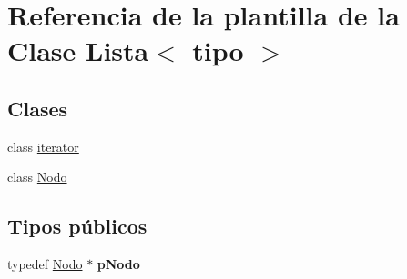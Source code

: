 \hypertarget{classLista}{}\section{Referencia de la plantilla de la Clase Lista$<$ tipo $>$}
\label{classLista}
\subsection*{Clases}
\begin{DoxyCompactItemize}
\item 
class \hyperlink{classLista_1_1iterator}{iterator}
\item 
class \hyperlink{classLista_1_1Nodo}{Nodo}
\end{DoxyCompactItemize}
\subsection*{Tipos públicos}
\begin{DoxyCompactItemize}
\item 
\mbox{\label{classLista_a0059fae2a7636eef85cdced28ab42386}} 
typedef \hyperlink{classLista_1_1Nodo}{Nodo} $\ast$ {\bfseries p\+Nodo}
\end{DoxyCompactItemize}
